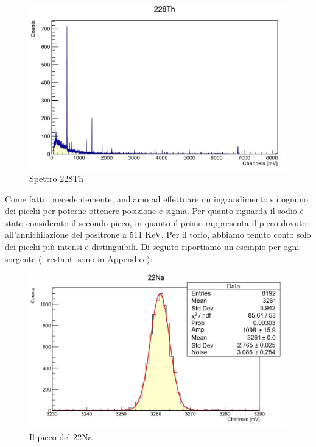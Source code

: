 \documentclass[a4paper,10pt]{article}
\begin{document}
\begin{figure}[!h]
    \centering
    \includegraphics[scale=0.6]{grafici/toriocompleto}
    \caption{Spettro 228Th}
\end{figure}

\noindent Come fatto precedentemente, andiamo ad effettuare un ingrandimento su ognuno dei picchi per poterne ottenere posizione e sigma. Per quanto riguarda il sodio \`e stato considerato il secondo picco, in quanto il primo rappresenta il picco dovuto all'annichilazione del positrone a 511 KeV. Per il torio, abbiamo tenuto conto solo dei picchi pi\`u intensi e distinguibili. Di seguito riportiamo un esempio per ogni sorgente (i restanti sono in Appendice):

\begin{figure}[H]
    \centering
    \includegraphics[scale=0.7]{grafici/piccoNa}
    \caption{Il picco del 22Na}
\end{figure}
\end{document}
